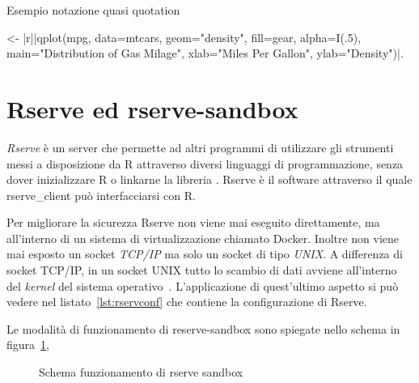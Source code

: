 \documentclass[10pt,titlepage,twoside,a4paper]{report}
\newenvironment{code}{\singlespacing\captionsetup{type=listing}}{}
\begin{document}
\begin{code}
    \caption{Esempio notazione quasi quotation}
    \label{lst:esempioquasiQuotation}
    \begin{prologcode*}{}
<- {|r||qplot(mpg, data=mtcars, geom="density", fill=gear, alpha=I(.5), main="Distribution of Gas Milage", xlab="Miles Per Gallon", ylab="Density")|}.
    \end{prologcode*}
\end{code}


\section{Rserve ed rserve-sandbox}

\emph{Rserve} è un server che permette ad altri programmi di
utilizzare gli strumenti messi a disposizione da R attraverso diversi
linguaggi di programmazione, senza dover inizializzare R o
linkarne la libreria \cite{rserve}. Rserve è il software attraverso il quale 
rserve\_client può interfacciarsi con R.

Per migliorare la sicurezza Rserve non 
viene mai eseguito direttamente, ma all'interno di un sistema di 
virtualizzazione chiamato Docker. Inoltre non viene mai esposto un socket 
\emph{TCP/IP} ma solo un socket di tipo \emph{UNIX}. A differenza di socket 
TCP/IP, in un socket UNIX tutto lo scambio di dati avviene all'interno del 
\emph{kernel} del sistema operativo~\cite{unixSocket}. 
L'applicazione di quest'ultimo aspetto si può vedere nel 
listato~\ref{lst:rservconf} che contiene la configurazione di Rserve.

Le modalità di funzionamento di reserve-sandbox sono spiegate nello schema in 
figura~\ref{fig:rserveSandboxScheme}, 

\begin{figure}[H]
\centering
\caption{Schema funzionamento di rserve sandbox}
\label{fig:rserveSandboxScheme}
\end{figure}
\end{document}
